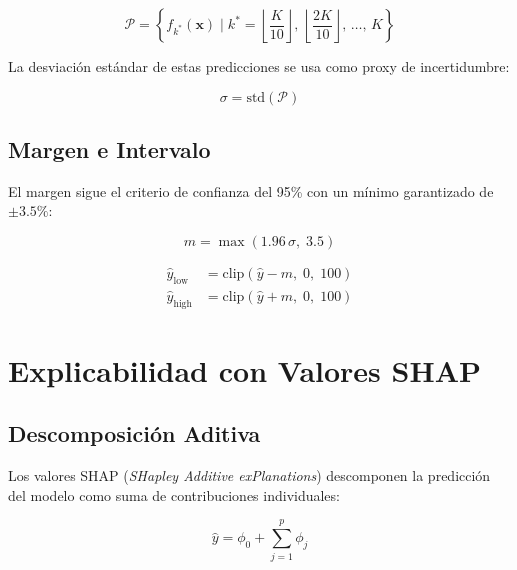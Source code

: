 \documentclass[12pt, a4paper]{article}
\begin{document}
\begin{equation}
  \mathcal{P} = \left\{ f_{k^*}(\mathbf{x}) \;\Big|\; k^* = \left\lfloor \frac{K}{10} \right\rfloor,\, \left\lfloor \frac{2K}{10} \right\rfloor,\, \ldots,\, K \right\}
  \label{eq:pred_parciales}
\end{equation}

La desviación estándar de estas predicciones se usa como proxy de incertidumbre:

\begin{equation}
  \sigma = \text{std}(\mathcal{P})
  \label{eq:sigma_ic}
\end{equation}

\subsection{Margen e Intervalo}

El margen sigue el criterio de confianza del 95\% con un mínimo garantizado de $\pm 3.5\%$:

\begin{equation}
  m = \max\!\left(1.96\,\sigma,\; 3.5\right)
  \label{eq:margen}
\end{equation}

\begin{align}
  \hat{y}_{\text{low}}  &= \text{clip}\!\left(\hat{y} - m,\; 0,\; 100\right) \label{eq:ic_low} \\
  \hat{y}_{\text{high}} &= \text{clip}\!\left(\hat{y} + m,\; 0,\; 100\right) \label{eq:ic_high}
\end{align}

\section{Explicabilidad con Valores SHAP}

\subsection{Descomposición Aditiva}

Los valores SHAP (\textit{SHapley Additive exPlanations}) descomponen la predicción del modelo como suma de contribuciones individuales:

\begin{equation}
  \hat{y} = \phi_0 + \sum_{j=1}^{p} \phi_j
  \label{eq:shap}
\end{equation}
\end{document}
